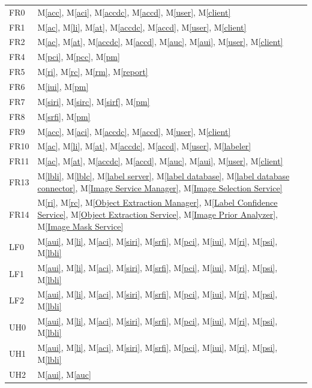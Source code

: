 \documentclass[12pt, titlepage]{article}
\newcommand{\mref}[1]{M\ref{#1}}
\begin{document}
\begin{longtable}{p{} p{}}
  FR0 & \mref{acc}, \mref{aci}, \mref{accdc}, \mref{accd}, \mref{user}, \mref{client} \\
  FR1 & \mref{ac}, \mref{li}, \mref{at}, \mref{accdc}, \mref{accd}, \mref{user}, \mref{client} \\
  FR2 & \mref{ac}, \mref{at}, \mref{accdc}, \mref{accd}, \mref{auc}, \mref{aui}, \mref{user}, \mref{client} \\
  FR4 &  \mref{pci}, \mref{pcc}, \mref{pm}\\
  FR5 &  \mref{ri}, \mref{rc}, \mref{rm}, \mref{report}\\
  FR6 &  \mref{iui}, \mref{pm} \\
  FR7 &  \mref{siri}, \mref{sirc}, \mref{sirf}, \mref{pm} \\
  FR8 &  \mref{srfi}, \mref{pm}\\
  FR9 & \mref{acc}, \mref{aci}, \mref{accdc}, \mref{accd}, \mref{user}, \mref{client} \\
  FR10 & \mref{ac}, \mref{li}, \mref{at}, \mref{accdc}, \mref{accd}, \mref{user}, \mref{labeler} \\
  FR11 & \mref{ac}, \mref{at}, \mref{accdc}, \mref{accd}, \mref{auc}, \mref{aui}, \mref{user}, \mref{client} \\
  FR13 &  \mref{lbli}, \mref{lblc}, \mref{label server}, \mref{label database}, \mref{label database connector}, \mref{Image Service Manager}, \mref{Image Selection Service}\\
  FR14 &  \mref{ri}, \mref{rc}, \mref{Object Extraction Manager}, \mref{Label Confidence Service}, \mref{Object Extraction Service}, \mref{Image Prior Analyzer}, \mref{Image Mask Service}  \\
  LF0 & \mref{aui}, \mref{li}, \mref{aci}, \mref{siri}, \mref{srfi}, \mref{pci}, \mref{iui}, \mref{ri}, \mref{psi}, \mref{lbli}\\
  LF1 & \mref{aui}, \mref{li}, \mref{aci}, \mref{siri}, \mref{srfi}, \mref{pci}, \mref{iui}, \mref{ri}, \mref{psi}, \mref{lbli}\\
  LF2 & \mref{aui}, \mref{li}, \mref{aci}, \mref{siri}, \mref{srfi}, \mref{pci}, \mref{iui}, \mref{ri}, \mref{psi}, \mref{lbli}\\
  UH0 & \mref{aui}, \mref{li}, \mref{aci}, \mref{siri}, \mref{srfi}, \mref{pci}, \mref{iui}, \mref{ri}, \mref{psi}, \mref{lbli}\\
  UH1 & \mref{aui}, \mref{li}, \mref{aci}, \mref{siri}, \mref{srfi}, \mref{pci}, \mref{iui}, \mref{ri}, \mref{psi}, \mref{lbli}\\
  UH2 & \mref{aui}, \mref{auc} \\

\end{longtable}
\end{document}
